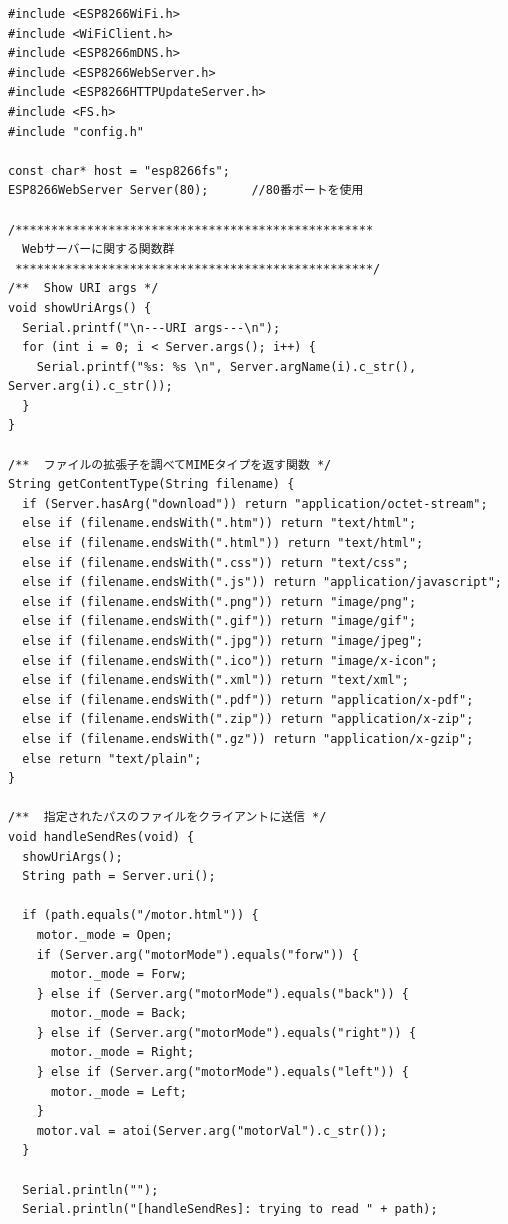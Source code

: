 \begin{verbatim}
#include <ESP8266WiFi.h>
#include <WiFiClient.h>
#include <ESP8266mDNS.h>
#include <ESP8266WebServer.h>
#include <ESP8266HTTPUpdateServer.h>
#include <FS.h>
#include "config.h"

const char* host = "esp8266fs";
ESP8266WebServer Server(80);      //80番ポートを使用

/**************************************************
  Webサーバーに関する関数群
 **************************************************/
/**  Show URI args */
void showUriArgs() {
  Serial.printf("\n---URI args---\n");
  for (int i = 0; i < Server.args(); i++) {
    Serial.printf("%s: %s \n", Server.argName(i).c_str(), Server.arg(i).c_str());
  }
}

/**  ファイルの拡張子を調べてMIMEタイプを返す関数 */
String getContentType(String filename) {
  if (Server.hasArg("download")) return "application/octet-stream";
  else if (filename.endsWith(".htm")) return "text/html";
  else if (filename.endsWith(".html")) return "text/html";
  else if (filename.endsWith(".css")) return "text/css";
  else if (filename.endsWith(".js")) return "application/javascript";
  else if (filename.endsWith(".png")) return "image/png";
  else if (filename.endsWith(".gif")) return "image/gif";
  else if (filename.endsWith(".jpg")) return "image/jpeg";
  else if (filename.endsWith(".ico")) return "image/x-icon";
  else if (filename.endsWith(".xml")) return "text/xml";
  else if (filename.endsWith(".pdf")) return "application/x-pdf";
  else if (filename.endsWith(".zip")) return "application/x-zip";
  else if (filename.endsWith(".gz")) return "application/x-gzip";
  else return "text/plain";
}

/**  指定されたパスのファイルをクライアントに送信 */
void handleSendRes(void) {
  showUriArgs();
  String path = Server.uri();

  if (path.equals("/motor.html")) {
    motor._mode = Open;
    if (Server.arg("motorMode").equals("forw")) {
      motor._mode = Forw;
    } else if (Server.arg("motorMode").equals("back")) {
      motor._mode = Back;
    } else if (Server.arg("motorMode").equals("right")) {
      motor._mode = Right;
    } else if (Server.arg("motorMode").equals("left")) {
      motor._mode = Left;
    }
    motor.val = atoi(Server.arg("motorVal").c_str());
  }

  Serial.println("");
  Serial.println("[handleSendRes]: trying to read " + path);


\end{verbatim}
